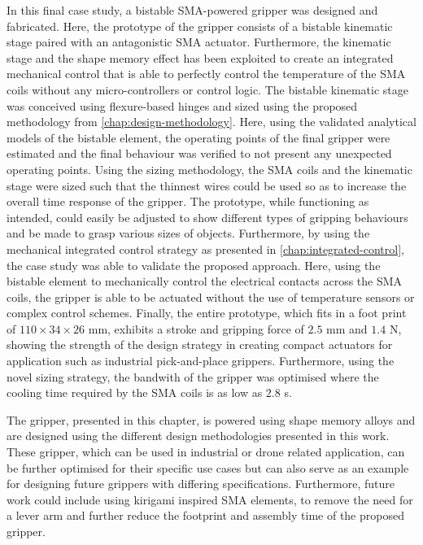 In this final case study, a bistable SMA-powered gripper was designed and fabricated. Here, the prototype of the gripper consists of a bistable kinematic stage paired with an antagonistic SMA actuator. Furthermore, the kinematic stage and the shape memory effect has been exploited to create an integrated mechanical control that is able to perfectly control the temperature of the SMA coils without any micro-controllers or control logic. The bistable kinematic stage was conceived using flexure-based hinges and sized using the proposed methodology from \cref{chap:design-methodology}. Here, using the validated analytical models of the bistable element, the operating points of the final gripper were estimated and the final behaviour was verified to not present any unexpected operating points. Using the sizing methodology, the SMA coils and the kinematic stage were sized such that the thinnest wires could be used so as to increase the overall time response of the gripper. The prototype, while functioning as intended, could easily be adjusted to show different types of gripping behaviours and be made to grasp various sizes of objects. Furthermore, by using the mechanical integrated control strategy as presented in \cref{chap:integrated-control}, the case study was able to validate the proposed approach. Here, using the bistable element to mechanically control the electrical contacts across the SMA coils, the gripper is able to be actuated without the use of temperature sensors or complex control schemes. Finally, the entire prototype, which fits in a foot print of $110\times34\times26$ mm, exhibits a stroke and gripping force of $2.5$ mm and $1.4$ N, showing the strength of the design strategy in creating compact actuators for application such as industrial pick-and-place grippers. Furthermore, using the novel sizing strategy, the bandwith of the gripper was optimised where the cooling time required by the SMA coils is as low as $2.8$ s.

The gripper, presented in this chapter, is powered using shape memory alloys and are designed using the different design methodologies presented in this work. These gripper, which can be used in industrial or drone related application, can be further optimised for their specific use cases but can also serve as an example for designing future grippers with differing specifications. Furthermore, future work could include using kirigami inspired SMA elements, to remove the need for a lever arm and further reduce the footprint and assembly time of the proposed gripper.


